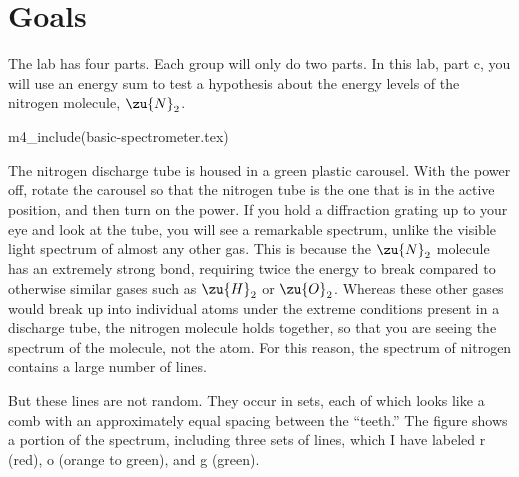 \addtocounter{chapter}{-1}
\renewcommand\thechapter{\arabic{chapter}c}
\label{lab:nitrogen}
\renewcommand\thechapter{\arabic{chapter}}

\apparatus
{}

\section*{Goals}

The lab has four parts. Each group will only do two parts.
In this lab, part c, you will use an energy sum to test a hypothesis about the energy levels of the nitrogen molecule, $\zu{N}_2$.

m4_include(basic-spectrometer.tex)

The nitrogen discharge tube is housed in a green plastic
carousel. With the power off, rotate the carousel so that the nitrogen tube is
the one that is in the active position, and then turn on the power.
If you hold a diffraction grating up to your eye and look at the
tube, you will see a remarkable spectrum, unlike the visible light
spectrum of almost any other gas. This is because the $\zu{N}_2$ molecule has
an extremely strong bond, requiring twice the energy to break compared to
otherwise similar gases such as $\zu{H}_2$ or $\zu{O}_2$.
Whereas these other gases would break up into individual atoms under the extreme
conditions present in a discharge tube, the nitrogen molecule holds together, so
that you are seeing the spectrum of the molecule, not the atom.
For this reason, the spectrum of nitrogen contains a large number of lines.


But these lines are not random. They occur in sets, each of which looks like
a comb with an approximately equal spacing between the ``teeth.'' The figure
shows a portion of the spectrum, including three sets of lines, which I have
labeled r (red), o (orange to green), and g (green).

